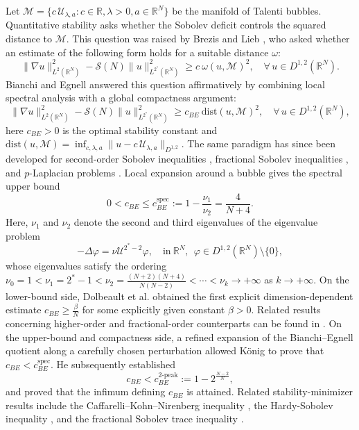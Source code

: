 \documentclass[11pt]{article}
\begin{document}
{Let $\mathcal{M}=\{c\,\mathcal{U}_{\lambda,a}:c\in\mathbb{R},\lambda>0,a\in\mathbb{R}^{N}\}$ be the manifold of Talenti bubbles. Quantitative stability asks whether the Sobolev deficit controls the squared distance to $\mathcal{M}$. This question was raised by Brezis and Lieb \cite{BL85}, who asked whether an estimate of the following form holds for a suitable distance $\omega$:}
\begin{equation*}
 \|\nabla u\|_{L^{2}(\mathbb{R}^{N})}^{2}-\mathcal{S}(N)\|u\|_{L^{2^{\ast}}(\mathbb{R}^{N})}^{2}\geq c \ \omega(u,\mathcal{M})^2,
 \quad \forall \, u\in{D}^{1,2}(\mathbb{R}^{N}).
\end{equation*}
{Bianchi and Egnell \cite{BE91} answered this question affirmatively by combining local spectral analysis with a global compactness argument:}
\begin{equation*}
 \|\nabla u\|_{L^{2}(\mathbb{R}^{N})}^{2}-\mathcal{S}(N)\|u\|_{L^{2^{\ast}}(\mathbb{R}^{N})}^{2}\geq c_{BE} ~ \mathrm{dist}(u,\mathcal{M})^2,
 \quad \forall \, u\in{D}^{1,2}(\mathbb{R}^{N}),
\end{equation*}
{here $c_{BE}>0$ is the optimal stability constant and $\mathrm{dist}(u,\mathcal{M})=\inf_{c,\lambda,a}\|u-c\, \mathcal{U}_{\lambda,a}\|_{D^{1,2}}$. The same paradigm has since been developed for second-order Sobolev inequalities \cite{LW2000}, fractional Sobolev inequalities \cite{CFW13}, and $p$-Laplacian problems \cite{FN19,FZ22,N20}. Local expansion around a bubble gives the spectral upper bound}
\begin{equation*}
 0<c_{BE}\leq c_{BE}^{\mathrm{spec}}:=1-\frac{\nu_1}{\nu_2}=\frac{4}{N+4}.
\end{equation*}
Here, $\nu_1$ and $\nu_2$ denote the second and third eigenvalues of the eigenvalue problem
\begin{equation*}
 -\Delta \varphi=\nu \mathcal{U}^{2^{\ast}-2}\varphi,\quad\mathrm{in}~\mathbb{R}^{N},~~\varphi\in D^{1,2}(\mathbb{R}^{N})\setminus \{0\},
\end{equation*}
whose eigenvalues satisfy the ordering $\nu_0=1<\nu_1=2^{\ast}-1<\nu_2=\frac{(N+2)(N+4)}{N(N-2)}<\cdots<\nu_k\rightarrow+\infty$ as $k\rightarrow+\infty$.
{On the lower-bound side, Dolbeault et al. \cite{DEFF25} obtained the first explicit dimension-dependent estimate}
$ c_{BE}\geq \frac{\beta}{N}$
for some explicitly given constant $\beta>0$. Related results concerning higher-order and fractional-order counterparts can be found in \cite{CLT25,CLT24,CLT24'}.
{On the upper-bound and compactness side, a refined expansion of the Bianchi--Egnell quotient along a carefully chosen perturbation allowed}
K\"{o}nig \cite{K23} {to prove that $c_{BE}<c_{BE}^{\mathrm{spec}}$. He subsequently established} \cite{K25}
\begin{equation*}
 c_{BE}< c_{BE}^{2\text{-peak}}:=1-2^\frac{N-2}{N},
\end{equation*}
{and proved that the infimum defining $c_{BE}$ is attained. Related stability-minimizer results include} the Caffarelli--Kohn--Nirenberg inequality \cite{DT23,DTW25,WW24}, the Hardy-Sobolev inequality \cite{CGK25}, and the fractional Sobolev trace inequality \cite{ZZZ25}.
\end{document}

